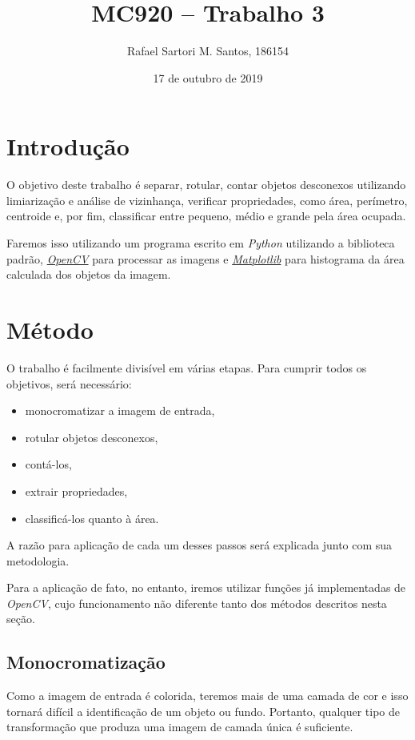 \documentclass[brazilian,a4paper,twocolumn]{article}
\title{MC920 -- Trabalho 3}
\author{Rafael Sartori M. Santos, 186154}
\date{17 de outubro de 2019}
\begin{document}
\maketitle


\section{Introdução}

    O objetivo deste trabalho é separar, rotular, contar objetos desconexos utilizando limiarização e análise de vizinhança, verificar propriedades, como área, perímetro, centroide e, por fim, classificar entre pequeno, médio e grande pela área ocupada.

    Faremos isso utilizando um programa escrito em \emph{Python} utilizando a biblioteca padrão, \href{https://opencv.org/}{\emph{OpenCV}} para processar as imagens e \href{https://matplotlib.org/}{\emph{Matplotlib}} para histograma da área calculada dos objetos da imagem.


\section{Método}

    O trabalho é facilmente divisível em várias etapas. Para cumprir todos os objetivos, será necessário:
    \begin{itemize}
        \item monocromatizar a imagem de entrada,
        \item rotular objetos desconexos,
        \item contá-los,
        \item extrair propriedades,
        \item classificá-los quanto à área.
    \end{itemize}

    A razão para aplicação de cada um desses passos será explicada junto com sua metodologia.

    Para a aplicação de fato, no entanto, iremos utilizar funções já implementadas de \emph{OpenCV}, cujo funcionamento não diferente tanto dos métodos descritos nesta seção.

    \subsection{Monocromatização}

        Como a imagem de entrada é colorida, teremos mais de uma camada de cor e isso tornará difícil a identificação de um objeto ou fundo. Portanto, qualquer tipo de transformação que produza uma imagem de camada única é suficiente.
\end{document}

